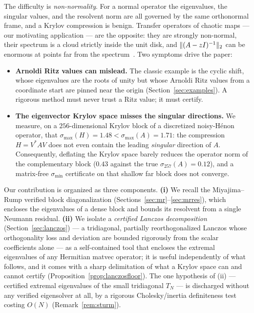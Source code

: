 \documentclass[11pt]{article}
\newcommand{\sigmin}{\sigma_{\min}}
\newcommand{\sigmax}{\sigma_{\max}}
\DeclarePairedDelimiter{\norm}{\lVert}{\rVert}
\begin{document}
The difficulty is \emph{non-normality}. For a normal operator the eigenvalues, the singular values,
and the resolvent norm are all governed by the same orthonormal frame, and a Krylov compression is
benign. Transfer operators of chaotic maps --- our motivating application --- are the opposite: they
are strongly non-normal, their spectrum is a cloud strictly inside the unit disk, and
$\norm{(A-zI)^{-1}}_2$ can be enormous at points far from the spectrum~\cite{TrefethenEmbree2005}. Two symptoms drive the paper:
\begin{itemize}
\item[(S1)] \textbf{Arnoldi Ritz values can mislead.} The classic example is the cyclic shift, whose
      eigenvalues are the roots of unity but whose Arnoldi Ritz values from a coordinate start are
      pinned near the origin (Section~\ref{sec:examples}). A rigorous method must never trust a Ritz
      value; it must certify.
\item[(S2)] \textbf{The eigenvector Krylov space misses the singular directions.} We measure, on a
      $256$-dimensional Krylov block of a discretized noisy-H\'enon operator, that
      $\sigmax(H)=1.48<\sigmax(A)=1.71$: the compression $H=V^*AV$ does not even contain the leading
      \emph{singular} direction of $A$. Consequently, deflating the Krylov space barely reduces the
      operator norm of the complementary block ($0.43$ against the true $\sigma_{257}(A)=0.12$), and
      a matrix-free $\sigmin$ certificate on that shallow far block does not converge.
\end{itemize}
Our contribution is organized as three components. \textbf{(i)} We recall the Miyajima--Rump verified
block diagonalization (Sections~\ref{sec:mr}--\ref{sec:mrres}), which encloses the eigenvalues of a
dense block and bounds its resolvent from a single Neumann residual. \textbf{(ii)} We isolate a
\emph{certified Lanczos decomposition} (Section~\ref{sec:lanczos}) --- a tridiagonal, partially
reorthogonalized Lanczos whose orthogonality loss and deviation are bounded rigorously from the
scalar coefficients alone --- as a self-contained tool that encloses the extremal eigenvalues of any
Hermitian matvec operator; it is useful independently of what follows, and it comes with a sharp
delimitation of what a Krylov space can and cannot certify (Proposition~\ref{prop:lanczosfloor}).
The one hypothesis of (ii) --- certified extremal eigenvalues of the small tridiagonal $T_N$ --- is
discharged without any verified eigensolver at all, by a rigorous Cholesky/inertia definiteness test
costing $O(N)$ (Remark~\ref{rem:sturm}).
\end{document}
